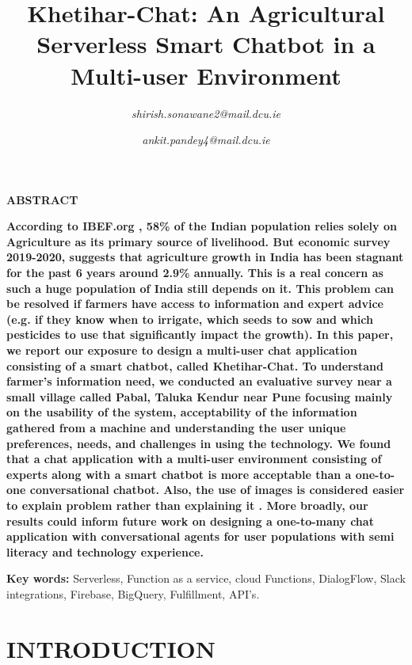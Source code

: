 \documentclass[10pt,conference]{IEEEtran}
\title{Khetihar-Chat: An Agricultural Serverless Smart Chatbot in a Multi-user Environment}
\author{
  \IEEEauthorblockN{Shirish Sonawane}
  \IEEEauthorblockN{Student ID: 19210656}
  \IEEEauthorblockA{Dublin City University}
  \IEEEauthorblockN{School of Computing.}
   \IEEEauthorblockA{Dublin, Ireland } 
   \IEEEauthorblockN{Supervisor: Dr. Long Cheng}
   \textit{shirish.sonawane2@mail.dcu.ie}
  \and
  \IEEEauthorblockN{Ankit Pandey}
  \IEEEauthorblockN{Student ID: 19211298}
  \IEEEauthorblockA{Dublin City University}
  \IEEEauthorblockN{School of Computing.}
  \IEEEauthorblockA{Dublin, Ireland } 
  \IEEEauthorblockN{Supervisor: Dr. Long Cheng}
  \textit{ankit.pandey4@mail.dcu.ie}
}
\begin{document}
\maketitle
\thispagestyle{plain}
\pagestyle{plain}
{\raggedright
\textbf{ABSTRACT}
}


{\raggedright
\textbf{According to IBEF.org \cite{botscognitive}, 58\% of the Indian population relies solely on Agriculture as its primary source of livelihood. But economic survey 2019-2020, suggests that agriculture growth in India has been stagnant for the past 6 years around 2.9\% annually. This is a real concern as such a huge population of India still depends on it. This problem can be resolved if farmers have access to information and expert advice (e.g. if they know when to irrigate, which seeds to sow and which pesticides to use that significantly impact the growth). In this paper, we report our exposure to design a multi-user chat application consisting of a smart chatbot, called Khetihar-Chat. To understand farmer’s information need, we conducted an evaluative survey near a small village called Pabal, Taluka Kendur near Pune focusing mainly on the usability of the system, acceptability of the information gathered from a machine and understanding the user unique preferences, needs, and challenges in using the technology. We found that a chat application with a multi-user environment consisting of experts along with a smart chatbot is more acceptable than a one-to-one conversational chatbot. Also, the use of images is considered easier to explain problem rather than explaining it \cite{bhattacharya2019remote}.  More broadly, our results could inform future work on designing a one-to-many chat application with conversational agents for user populations with semi literacy and technology experience.
}}
\newline
\newline
{\raggedright
\textbf{Key words: }Serverless, Function as a service, cloud Functions, DialogFlow, Slack integrations, Firebase, BigQuery, Fulfillment, API’s.
}



	\section{INTRODUCTION}
\end{document}
